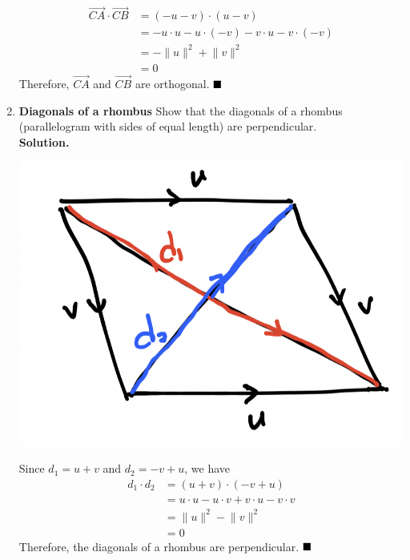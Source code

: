 \documentclass{report}
\begin{document}
\begin{enumerate}
\begin{align*}
              \overrightarrow{C A} \cdot \overrightarrow{C B} & = (-u - v) \cdot (u - v)                               \\
                                                              & = -u \cdot u - u \cdot (-v) - v \cdot u - v \cdot (-v) \\
                                                              & = -\lVert u \rVert^2 + \lVert v \rVert^2               \\
                                                              & = 0
          \end{align*}
          Therefore, $\overrightarrow{C A}$ and $\overrightarrow{C B}$ are orthogonal. $\hfill\blacksquare$

    \item \textbf{Diagonals of a rhombus} Show that the diagonals of a rhombus (parallelogram with
          sides of equal length) are perpendicular.
          \\\textbf{Solution.}
          \begin{center}
              \includegraphics[scale=0.4]{assets/thomas12.3q21.png}
          \end{center}
          Since $d_1 = u + v$ and $d_2 = -v + u$, we have
          \begin{align*}
              d_1 \cdot d_2 & = (u + v) \cdot (-v + u)                        \\
                            & = u \cdot u - u \cdot v + v \cdot u - v \cdot v \\
                            & = \lVert u \rVert^2 - \lVert v \rVert^2         \\
                            & = 0
          \end{align*}
          Therefore, the diagonals of a rhombus are perpendicular. $\hfill\blacksquare$


\end{enumerate}
\end{document}
